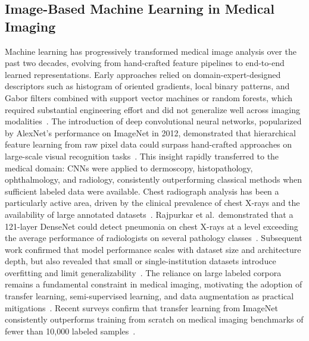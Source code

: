 \documentclass[preprint,12pt]{elsarticle}
\begin{document}
\subsection{Image-Based Machine Learning in Medical Imaging}
Machine learning has progressively transformed medical image analysis
over the past two decades, evolving from hand-crafted feature pipelines
to end-to-end learned representations.
Early approaches relied on domain-expert-designed descriptors such as
histogram of oriented gradients, local binary patterns, and Gabor
filters combined with support vector machines or random forests, which
required substantial engineering effort and did not generalize well
across imaging modalities~\cite{krizhevsky2012}.
The introduction of deep convolutional neural networks, popularized by
AlexNet's performance on ImageNet in 2012, demonstrated that
hierarchical feature learning from raw pixel data could surpass
hand-crafted approaches on large-scale visual recognition
tasks~\cite{krizhevsky2012}.
This insight rapidly transferred to the medical domain: CNNs were
applied to dermoscopy, histopathology, ophthalmology, and radiology,
consistently outperforming classical methods when sufficient labeled
data were available.
Chest radiograph analysis has been a particularly active area, driven
by the clinical prevalence of chest X-rays and the availability of
large annotated datasets~\cite{rajpurkar2017chexnet}.
Rajpurkar et al.\ demonstrated that a 121-layer DenseNet could
detect pneumonia on chest X-rays at a level exceeding the average
performance of radiologists on several pathology classes~\cite{rajpurkar2017chexnet}.
Subsequent work confirmed that model performance scales with dataset
size and architecture depth, but also revealed that small or
single-institution datasets introduce overfitting and limit
generalizability~\cite{hashmi2020}.
The reliance on large labeled corpora remains a fundamental constraint
in medical imaging, motivating the adoption of transfer learning,
semi-supervised learning, and data augmentation as practical
mitigations~\cite{reshan2023}.
Recent surveys confirm that transfer learning from ImageNet
consistently outperforms training from scratch on medical imaging
benchmarks of fewer than 10{,}000 labeled samples~\cite{liang2020}.

\end{document}
